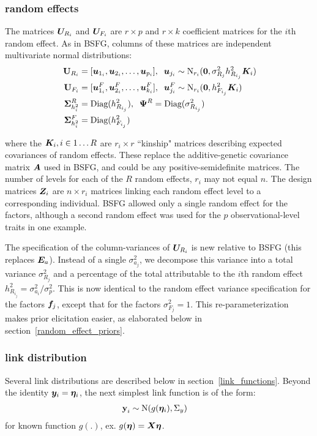 \documentclass[11pt]{amsart}
\newcommand*{\B}[1]{\ifmmode\bm{#1}\else\textbf{#1}\fi}
\begin{document}
\subsubsection{random effects}
The matrices $\B{U}_{R_i}$ and $\B{U}_{F_i}$ are $r \times p$ and $r \times k$ coefficient matrices for the $i$th random effect. As in BSFG, columns of these matrices are independent multivariate normal distributions:
\begin{align} \begin{split}
\B{U}_{R_i} &= [\B{u}_{1_i}, \B{u}_{2_i},\dots,\B{u}_{p_i}],\;\; \B{u}_{j_i} \sim \mbox{N}_{r_i}(\B{0},\sigma^2_{R_j}h^2_{R_{i_j}}\B{K}_i) \\
\B{U}_{F_i} &=  [\B{u}^F_{1_i}, \B{u}^F_{2_i},\dots,\B{u}^F_{k_i}],\;\; \B{u}^F_{j_i} \sim \mbox{N}_{r_i}(\B{0},h^2_{F_{i_j}}\B{K}_i)\\
\;\B{\Sigma}^R_{h^2_i} &= \mbox{Diag}(h^2_{R_{i_j}}),\;\;\B{\Psi}^R = \mbox{Diag}(\sigma^2_{R_{i_j}}) \\
\;\B{\Sigma}^F_{h^2_i} &= \mbox{Diag}(h^2_{F_{i_j}})
\end{split} \end{align}

\noindent where the $\B{K}_i, i \in 1\dots R$ are $r_i \times r$ ``kinship" matrices describing expected covariances of random effects. These replace the additive-genetic covariance matrix $\B{A}$ used in BSFG, and could be any positive-semidefinite matrices. The number of levels for each of the $R$ random effects, $r_i$ may not equal $n$. The design matrices $\B{Z}_i$ are $n \times r_i$ matrices linking each random effect level to a corresponding individual. BSFG allowed only a single random effect for the factors, although a second random effect was used for the $p$ observational-level traits in one example. 

The specification of the column-variances of $\B{U}_{R_i}$ is new relative to BSFG (this replaces $\B{E}_a$). Instead of a single $\sigma^2_{a_j}$, we decompose this variance into a total variance $\sigma^2_{R_j}$ and a percentage of the total attributable to the $i$th random effect $h^2_{R_{i_j}} = \sigma^2_{a_i}/\sigma^2_p$. This is now identical to the random effect variance specification for the factors $\B{f}_j$, except that for the factors $\sigma^2_{F_j} = 1$. This re-parameterization makes prior elicitation easier, as elaborated below in section~\ref{random_effect_priors}.

\subsubsection{link distribution}
Several link distributions are described below in section~\ref{link_functions}. 
Beyond the identity $\B{y}_i = \B{\eta}_i$, the next simplest link function is of the form:
\begin{align}
\B{y}_i &\sim \mbox{N}(g(\B{\eta}_i),\Sigma_y)
\end{align}
\noindent for known function $g(.)$, ex. $g(\B{\eta}) = \B{X}\B{\eta}$.
\end{document}
